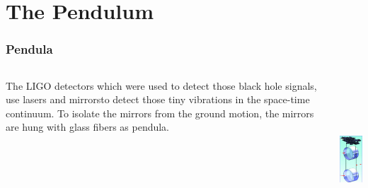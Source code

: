 \documentclass[pdf,hideothersubsections]{beamer}
\begin{document}
\section{The Pendulum}
\begin{frame}
\frametitle{Pendula}

\begin{columns}[T]
   \begin{column}{0.5\textwidth}
    The LIGO detectors which were used to detect those black hole signals, use lasers and mirrors\footnotemark to detect those tiny vibrations in the space-time continuum. To isolate the mirrors from the ground motion, the mirrors are hung with 
glass fibers as pendula\footnotemark.

   \end{column}

   \pause
   \begin{column}{0.5\textwidth}
   \includegraphics[height=6cm]{LIGO-Pendulum-diagram.png}      

   \end{column}
  
\end{columns}

\end{frame}
\end{document}
